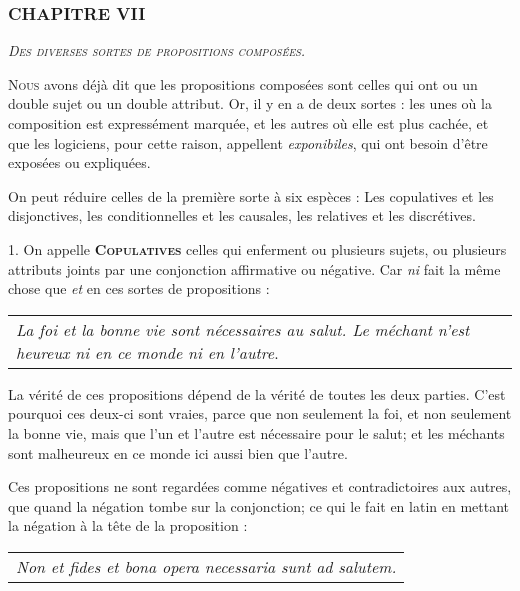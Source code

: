 \subsubsection{\centering \Large CHAPITRE VII}
\begin{center}\emph{\large\scshape Des diverses sortes de propositions composées.}\end{center}

	\lettrine{N}{ous} avons déjà dit que les propositions composées sont celles qui ont ou un double sujet ou un double attribut. Or, il y en a de deux sortes : les unes où la composition est expressément marquée, et les autres où elle est plus cachée, et que les logiciens, pour cette raison, appellent \emph{exponibiles}, qui ont besoin d'être exposées ou expliquées.

On peut réduire celles de la première sorte à six espèces : Les copulatives et les disjonctives, les conditionnelles et les causales, les relatives et les discrétives.

\bigbreak
{1.} On appelle {\bfseries\scshape Copulatives} celles qui enferment ou plusieurs sujets, ou plusieurs attributs joints par une conjonction affirmative ou négative. Car \emph{ni} fait la même chose que \emph{et} en ces sortes de propositions :
	\begin{tabularx}{\textwidth}{X}
		\emph{La foi et la bonne vie sont nécessaires au salut. Le méchant n'est heureux ni en ce monde ni en l'autre}. \\
	\end{tabularx}

La vérité de ces propositions dépend de la vérité de toutes les deux parties. C'est pourquoi ces deux-ci sont vraies, parce que non seulement la foi, et non seulement la bonne vie, mais que l'un et l'autre est nécessaire pour le salut; et les méchants sont malheureux en ce monde ici aussi bien que l'autre.

Ces propositions ne sont regardées comme négatives et contradictoires aux autres, que quand la négation tombe sur la conjonction; ce qui le fait en latin en mettant la négation à la tête de la proposition :

	\begin{tabularx}{\textwidth}{X}
\emph{Non et fides et bona opera necessaria sunt ad salutem.} \\
	\end{tabularx}

